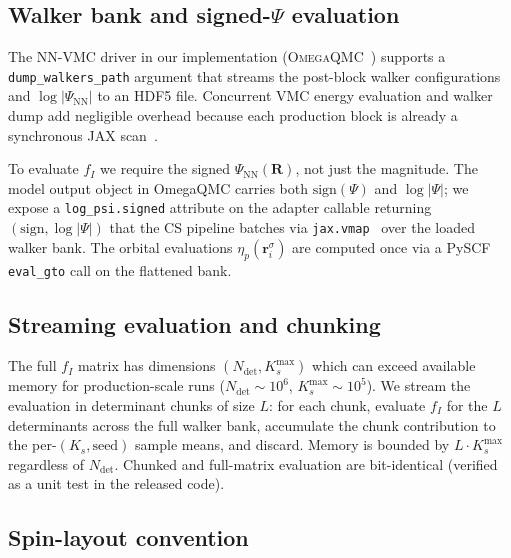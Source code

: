 \documentclass[journal=jctcce,manuscript=suppinfo,layout=traditional]{achemso}
\begin{document}
\subsection{Walker bank and signed-$\Psi$ evaluation}

The NN-VMC driver in our implementation
(\textsc{OmegaQMC}~\cite{Pfau2020FermiNet,Hermann2020PauliNet})
supports a \texttt{dump\_walkers\_path} argument that streams the
post-block walker configurations and $\log|\Psi_{\mathrm{NN}}|$ to an
HDF5 file. Concurrent VMC energy evaluation and walker dump add
negligible overhead because each production block is already a
synchronous JAX scan~\cite{JAX2018}.

To evaluate $f_I$ we require the signed
$\Psi_{\mathrm{NN}}(\mathbf{R})$, not just the magnitude. The model
output object in OmegaQMC carries both $\mathrm{sign}(\Psi)$ and
$\log|\Psi|$; we expose a \texttt{log\_psi.signed} attribute on the
adapter callable returning $(\mathrm{sign}, \log|\Psi|)$ that the CS
pipeline batches via \texttt{jax.vmap}~\cite{JAX2018,Heek2024Flax} over
the loaded walker bank. The orbital evaluations
$\eta_p(\mathbf{r}_i^{\sigma})$ are computed once via a PySCF
\texttt{eval\_gto} call on the flattened bank.

\subsection{Streaming evaluation and chunking}

The full $f_I$ matrix has dimensions $(N_{\mathrm{det}},
K_s^{\mathrm{max}})$ which can exceed available memory for
production-scale runs ($N_{\mathrm{det}} \sim 10^6$,
$K_s^{\mathrm{max}} \sim 10^5$). We stream the evaluation in
determinant chunks of size $L$: for each chunk, evaluate $f_I$ for the
$L$ determinants across the full walker bank, accumulate the chunk
contribution to the per-$(K_s, \text{seed})$ sample means, and
discard. Memory is bounded by $L \cdot K_s^{\mathrm{max}}$ regardless
of $N_{\mathrm{det}}$. Chunked and full-matrix evaluation are
bit-identical (verified as a unit test in the released code).

\subsection{Spin-layout convention}
\end{document}
